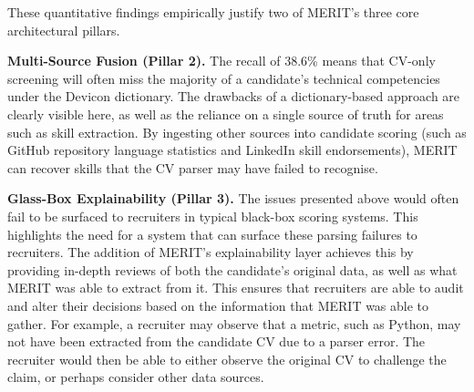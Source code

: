 These quantitative findings empirically justify two of MERIT's three core architectural pillars.

\textbf{Multi-Source Fusion (Pillar 2).} The recall of 38.6\% means that CV-only screening will often miss the majority of a candidate's technical competencies
under the Devicon dictionary. The drawbacks of a dictionary-based approach are clearly visible here, as well as the 
reliance on a single source of truth for areas such as skill extraction. By ingesting other sources into candidate
scoring (such as GitHub repository language statistics and LinkedIn skill endorsements), MERIT can recover 
skills that the CV parser may have failed to recognise. 


\textbf{Glass-Box Explainability (Pillar 3).} The issues presented above would often fail to be surfaced to recruiters in typical black-box scoring systems.
This highlights the need for a system that can surface these parsing failures to recruiters. The addition of 
MERIT's explainability layer achieves this by providing in-depth reviews of both the candidate's original 
data, as well as what MERIT was able to extract from it. This ensures that recruiters are able to audit and alter
their decisions based on the information that MERIT was able to gather. For example, a recruiter may observe that
a metric, such as Python, may not have been extracted from the candidate CV due to a parser error. The recruiter would
then be able to either observe the original CV to challenge the claim, or perhaps consider other data sources.
